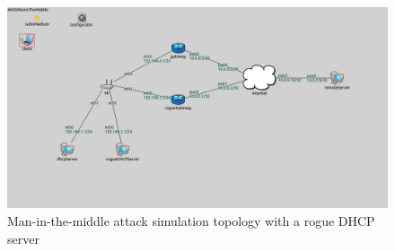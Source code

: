 \documentclass[letterpaper, 10 pt, conference]{ieeeconf}  %
\begin{document}



\begin{figure}
\centering
\includegraphics[scale=0.4]{figures/topology.png}
\caption{Man-in-the-middle attack simulation topology with a rogue DHCP server}\label{fig:topology}
\end{figure}
\end{document}
